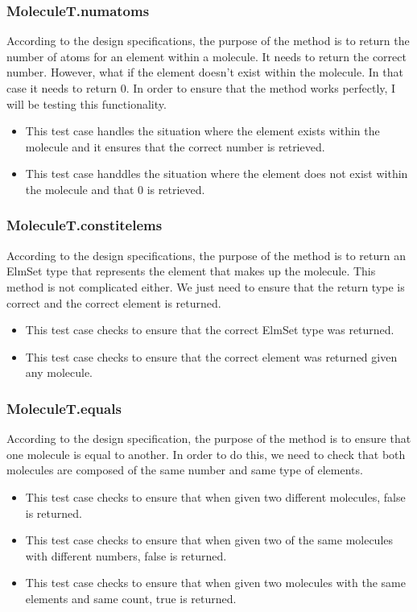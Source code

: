 \documentclass[12pt]{article}
\begin{document}
\subsubsection{MoleculeT.num\textunderscore atoms}
According to the design specifications, the purpose of the method is to return the number of atoms for an element within a molecule.
It needs to return the correct number. However, what if the element doesn't exist within the molecule. In that case it needs to return 0.
In order to ensure that the method works perfectly, I will be testing this functionality.

\begin{itemize}
  \item This test case handles the situation where the element exists within the molecule and it ensures that the correct number is retrieved.
  \item This test case handdles the situation where the element does not exist within the molecule and that 0 is retrieved.
\end{itemize}

\subsubsection{MoleculeT.constit\textunderscore elems}
According to the design specifications, the purpose of the method is to return an ElmSet type that represents the element that makes up the molecule.
This method is not complicated either. We just need to ensure that the return type is correct and the correct element is returned.

\begin{itemize}
  \item This test case checks to ensure that the correct ElmSet type was returned.
  \item This test case checks to ensure that the correct element was returned given any molecule.
\end{itemize}

\subsubsection{MoleculeT.equals\textunderscore }
According to the design specification, the purpose of the method is to ensure that one molecule is equal to another.
In order to do this, we need to check that both molecules are composed of the same number and same type of elements.

\begin{itemize}
  \item This test case checks to ensure that when given two different molecules, false is returned.
  \item This test case checks to ensure that when given two of the same molecules with different numbers, false is returned.
  \item This test case checks to ensure that when given two molecules with the same elements and same count, true is returned.
\end{itemize}
\end{document}
